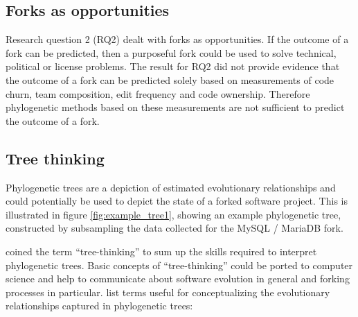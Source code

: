 \subsection{Forks as opportunities}
Research question 2 (RQ2) dealt with forks as opportunities. If the outcome of a fork can be predicted, then a purposeful fork could be used to solve technical, political or license problems. The result for RQ2 did not provide evidence that the outcome of a fork can be predicted solely based on measurements of code churn, team composition, edit frequency and code ownership. Therefore phylogenetic methods based on these measurements are not sufficient to predict the outcome of a fork.

\subsection{Tree thinking}
Phylogenetic trees are a depiction of estimated evolutionary relationships and could potentially be used to depict the state of a forked software project. This is illustrated in figure \ref{fig:example_tree1}, showing an example phylogenetic tree, constructed by subsampling the data collected for the MySQL / MariaDB fork. 

\citet{Baum2008b} coined the term “tree-thinking” to sum up the skills required to interpret phylogenetic trees. Basic concepts of “tree-thinking” could be ported to computer science and help to communicate about software evolution in general and forking processes in particular. \citet{Baum2008b} list terms useful for conceptualizing the evolutionary relationships captured in phylogenetic trees:

